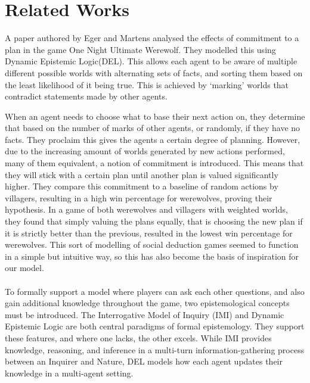 \section{Related Works} \label{sec:RelatedWorks}
A paper authored by Eger and Martens\cite{commitment} analysed the effects of
commitment to a plan in the game One Night Ultimate Werewolf. They modelled
this using Dynamic Epistemic Logic(DEL). This allows each agent to be aware of
multiple different possible worlds with alternating sets of facts, and sorting
them based on the least likelihood of it being true. This is achieved by
‘marking’ worlds that contradict statements made by other agents.

When an agent needs to choose what to base their next action on, they determine
that based on the number of marks of other agents, or randomly, if they have no
facts. They proclaim this gives the agents a certain degree of planning.
However, due to the increasing amount of worlds generated by new actions
performed, many of them equivalent, a notion of commitment is introduced. This
means that they will stick with a certain plan until another plan is valued
significantly higher. They compare this commitment to a baseline of random
actions by villagers, resulting in a high win percentage for werewolves,
proving their hypothesis. In a game of both werewolves and villagers with
weighted worlds, they found that simply valuing the plans equally, that is
choosing the new plan if it is strictly better than the previous, resulted in
the lowest win percentage for werewolves. This sort of modelling of social
deduction games seemed to function in a simple but intuitive way, so this has
also become the basis of inspiration for our model. \\ \\ To formally support a
model where players can ask each other questions, and also gain additional
knowledge throughout the game, two epistemological concepts must be introduced.
The Interrogative Model of Inquiry (IMI) and Dynamic Epistemic Logic are both
central paradigms of formal epistemology. They support these features, and
where one lacks, the other excels. While IMI provides knowledge, reasoning, and
inference in a multi-turn information-gathering process between an Inquirer and
Nature, DEL models how each agent updates their knowledge in a multi-agent
setting.

